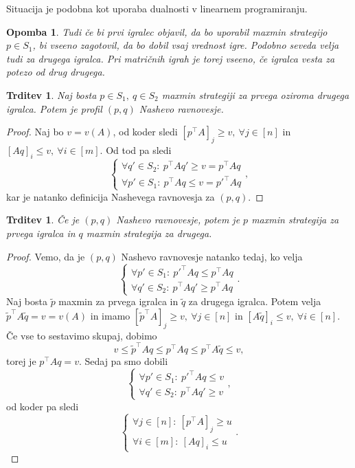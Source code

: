 \documentclass[10pt, a4paper]{article}
\newtheorem{trditev}[izr]{Trditev}
\newtheorem*{opomba}{Opomba}
\newenvironment{noticeC}{%
  \tcolorbox[%
  notitle,
  empty,
  enhanced,  %
  breakable,
  coltext=black, 
  fontupper=\rmfamily,
  noparskip,
  sharp corners,
  boxrule=-1pt,  %
  frame hidden,
  left=7pt,  %
  right=7pt,
  top=5pt,
  bottom=5pt,
  before skip=2.5ex plus 2pt,
  after skip=2.5ex plus 2pt,
  overlay unbroken and last={%
  },
  ]}
{\endtcolorbox}
\newenvironment{dokaz}%
  {\begin{noticeC}\begin{proof}}%
  {\end{proof}\end{noticeC}}
\begin{document}
Situacija je podobna kot uporaba dualnosti v linearnem programiranju.

\begin{opomba}
  Tudi če bi prvi igralec objavil, da bo uporabil maxmin strategijo $p \in S_1$,
  bi vseeno zagotovil, da bo dobil vsaj vrednost igre. Podobno seveda velja tudi za drugega igralca.
  Pri matričnih igrah je torej vseeno, če igralca vesta za potezo od drug drugega.
\end{opomba}

\begin{trditev}
  Naj bosta $p \in S_1,\ q \in S_2$ maxmin strategiji za prvega oziroma drugega igralca.
  Potem je profil $(p, q)$ Nashevo ravnovesje. 
\end{trditev}

\begin{dokaz}
  Naj bo $v = v(A)$, od koder sledi $[p^\top A]_j \geq v,\ \forall j \in [n]$ in 
  $[Aq]_i \leq v,\ \forall i \in [m]$. Od tod pa sledi
  $$\begin{cases}
    \forall q' \in S_2:\ p^\top Aq' \geq v = p^\top A q\\
    \forall p' \in S_1:\ p^\top Aq \leq v = p'^\top A q
  \end{cases},$$
  kar je natanko definicija Nashevega ravnovesja za $(p, q)$.
\end{dokaz}

\begin{trditev}
  Če je $(p, q)$ Nashevo ravnovesje, potem je $p$ maxmin strategija za prvega igralca in $q$ maxmin strategija za drugega.
\end{trditev}

\begin{dokaz}
  Vemo, da je $(p, q)$ Nashevo ravnovesje natanko tedaj, ko velja 
  $$\begin{cases}
    \forall p' \in S_1:\ p'^\top Aq \leq p^\top A q\\
    \forall q' \in S_2:\ p^\top Aq' \geq p^\top A q
  \end{cases}.$$
  Naj bosta $\widetilde{p}$ maxmin za prvega igralca in $\widetilde{q}$
  za drugega igralca. Potem velja $\widetilde{p}^\top A \widetilde{q} = v = v(A)$ in imamo 
  $[\widetilde{p}^\top A]_j \geq v,\ \forall j \in [n]$ in $[A \widetilde{q}]_i \leq v,\ \forall i \in [n]$.
  Če vse to sestavimo skupaj, dobimo 
  $$v \leq \widetilde{p}^\top A q \leq p^\top A q \leq p^\top A \widetilde{q} \leq v,$$
  torej je $p^\top A q = v.$ Sedaj pa smo dobili 
  $$\begin{cases}
    \forall p' \in S_1:\ p'^\top Aq \leq v\\
    \forall q' \in S_2:\ p^\top Aq' \geq v
  \end{cases},$$
  od koder pa sledi 
  $$\begin{cases}
    \forall j \in [n]:\ [p^\top A]_j \geq u\\
    \forall i \in [m]:\ [Aq]_i \leq u
  \end{cases}.$$
\end{dokaz}
\end{document}
